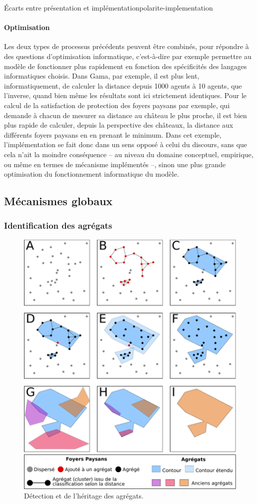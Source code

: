 \begin{encadre}{Écarts entre présentation et implémentation}{polarite-implementation}
\paragraph{Optimisation} Les deux types de processus précédents peuvent être combinés, pour répondre à des questions d'optimisation informatique, c'est-à-dire par exemple permettre au modèle de fonctionner plus rapidement en fonction des spécificités des langages informatiques choisis.
Dans Gama, par exemple, il est plus lent, informatiquement, de calculer la distance depuis 1000 agents à 10 agents, que l'inverse, quand bien même les résultats sont ici strictement identiques.
Pour le calcul de la satisfaction de protection des foyers paysans par exemple, qui demande à chacun de mesurer sa distance au château le plus proche, il est bien plus rapide de calculer, depuis la perspective des châteaux, la distance aux différents foyers paysans en en prenant le minimum.
Dans cet exemple, l'implémentation se fait donc dans un sens opposé à celui du discours, sans que cela n'ait la moindre conséquence -- au niveau du domaine conceptuel, empirique, ou même en termes de mécanisme implémentés --, sinon une plus grande optimisation du fonctionnement informatique du modèle.
\end{encadre}

\subsection{Mécanismes globaux}

\subsubsection{Identification des agrégats \label{sssec:agregats}}
	
\begin{figure}[H]
	\centering
	\includegraphics[width=.75\linewidth]{img/detection_agregats.pdf}
	\caption{Détection et de l'héritage des agrégats.}
	\label{fig:detection-agregats}
\end{figure}

